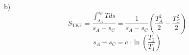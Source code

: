 b)
\[
\dot{S}_{\text{TKF}} = \frac{\int_{s_A}^{s_C} T ds}{s_A - s_C} = \frac{1}{s_A - s_C} \left( \frac{T_A^2}{2} - \frac{T_C^2}{2} \right)
\]
\[
s_A - s_C = c \cdot \ln \left( \frac{T_2}{T_1} \right)
\]